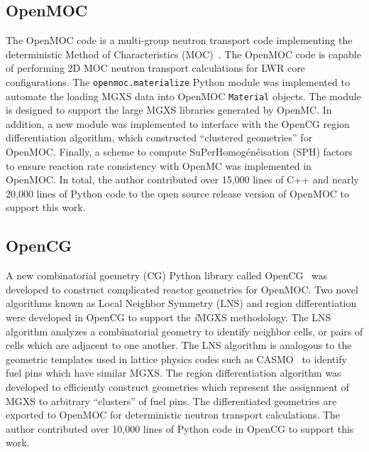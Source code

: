 \documentclass[12pt,twoside]{mitthesis-exec}
\begin{document}
\subsection*{OpenMOC}

The OpenMOC code is a multi-group neutron transport code implementing the deterministic Method of Characteristics (MOC)~\cite{boyd2014openmoc}. The OpenMOC code is capable of performing 2D MOC neutron transport calculations for LWR core configurations. The \texttt{openmoc.materialize} Python module was implemented to automate the loading MGXS data into OpenMOC \texttt{Material} objects. The module is designed to support the large MGXS libraries generated by OpenMC. In addition, a new module was implemented  to interface with the OpenCG region differentiation algorithm, which constructed ``clustered geometries'' for OpenMOC. Finally, a scheme to compute SuPerHomog\'{e}n\'{e}isation (SPH) factors to ensure reaction rate consistency with OpenMC was implemented in OpenMOC. In total, the author contributed over 15,000 lines of C++ and nearly 20,000 lines of Python code to the open source release version of OpenMOC to support this work.

\subsection*{OpenCG}

A new combinatorial goemetry (CG) Python library called OpenCG~\cite{boyd2015opencg} was developed to construct complicated reactor geometries for OpenMOC. Two novel algorithms known as Local Neighbor Symmetry (LNS) and region differentiation were developed in OpenCG to support the \textit{i}MGXS methodology. The LNS algorithm analyzes a combinatorial geometry to identify neighbor cells, or pairs of cells which are adjacent to one another. The LNS algorithm is analogous to the geometric templates used in lattice physics codes such as CASMO~\cite{edenius1995casmo} to identify fuel pins which have similar MGXS. The region differentiation algorithm was developed to efficiently construct geometries which represent the assignment of MGXS to arbitrary ``clusters'' of fuel pins. The differentiated geometries are exported to OpenMOC for deterministic neutron transport calculations. The author contributed over 10,000 lines of Python code in OpenCG to support this work.
\end{document}
